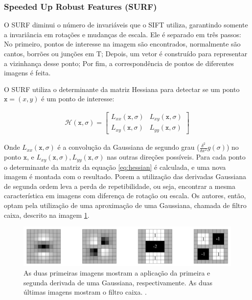 \subsubsection{Speeded Up Robust Features (SURF)}

  O SURF diminui o número de invariáveis que o SIFT utiliza, garantindo somente a invariância em rotações e mudanças de 
escala. Ele é separado em três passos: No primeiro, pontos de interesse na imagem são encontrados, normalmente são 
cantos, borrões ou junções em T; Depois, um vetor é construído para representar a vizinhança desse ponto; Por fim, a 
correspondência de pontos de diferentes imagens é feita.

  O SURF utiliza o determinante da matriz Hessiana para detectar se um ponto $\mathtt{x} = (x, y)$ é um ponto de 
interesse:

\begin{align}\label{eq:hessian}
    \mathcal{H}(\mathtt{x}, \sigma) = 
      \begin{bmatrix} 
        L_{xx}(\mathtt{x}, \sigma) & L_{xy}(\mathtt{x}, \sigma) \\
        L_{xy}(\mathtt{x}, \sigma) & L_{yy}(\mathtt{x}, \sigma)
      \end{bmatrix}
\end{align}

  Onde $L_{xx}(\mathtt{x}, \sigma)$ é a convolução da Gaussiana de segundo grau ($ \frac{\delta^2}{\delta x^2} g(\sigma) $) 
no ponto $\mathtt{x}$, e $L_{xy}(\mathtt{x}, \sigma), L_{yy}(\mathtt{x}, \sigma)$ nas outras direções possíveis. Para 
cada ponto o determinante da matriz da equação \ref{eq:hessian} é calculada, e uma nova imagem é montada com o resultado.
Porem a utilização das derivadas Gaussiana de segunda ordem leva a perda de repetibilidade, ou seja, encontrar a mesma 
característica em imagens com diferença de rotação ou escala. Os autores, então, optam pela utilização de uma aproximação 
de uma Gaussiana, chamada de filtro caixa, descrito na imagem \ref{fig:box}. 

\begin{figure}[h]
    \centering
    \includegraphics[width=1\textwidth]{figuras/boxFilter.png}
    \caption{As duas primeiras imagens mostram a aplicação da primeira e segunda derivada de uma Gaussiana, 
             respectivamente. As duas últimas imagens mostram o filtro caixa. \cite{surfHolroyd}.}
    \label{fig:box}
\end{figure}
  
